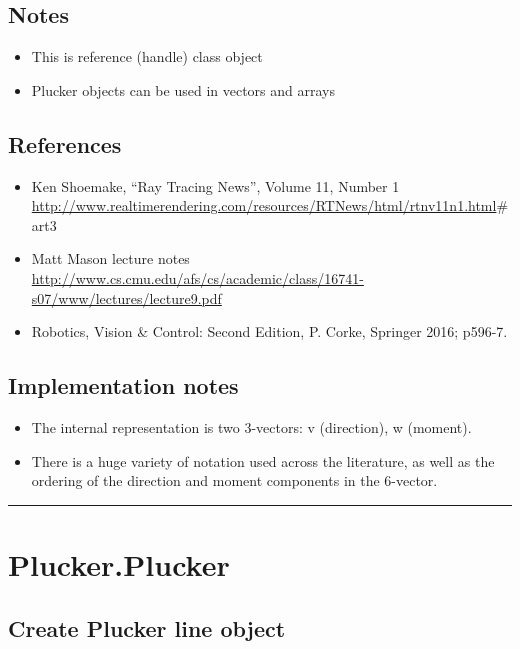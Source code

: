 \subsection*{Notes}
\begin{itemize}
  \item This is reference (handle) class object
  \item Plucker objects can be used in vectors and arrays
\end{itemize}

\subsection*{References}
\begin{itemize}
  \item Ken Shoemake, ``Ray Tracing News'', Volume 11, Number 1     \url{http://www.realtimerendering.com/resources/RTNews/html/rtnv11n1.html}\#art3
  \item Matt Mason lecture notes \url{http://www.cs.cmu.edu/afs/cs/academic/class/16741-s07/www/lectures/lecture9.pdf}
  \item Robotics, Vision \& Control: Second Edition, P. Corke, Springer 2016; p596-7.
\end{itemize}

\subsection*{Implementation notes}
\begin{itemize}
  \item The internal representation is two 3-vectors: v (direction), w (moment).
  \item There is a huge variety of notation used across the literature, as well as the ordering     of the direction and moment components in the 6-vector.
\end{itemize}
\vspace{1.5ex}\hrule

\hypertarget{Plucker.Plucker}{\section*{Plucker.Plucker}}
\subsection*{Create Plucker line object}


